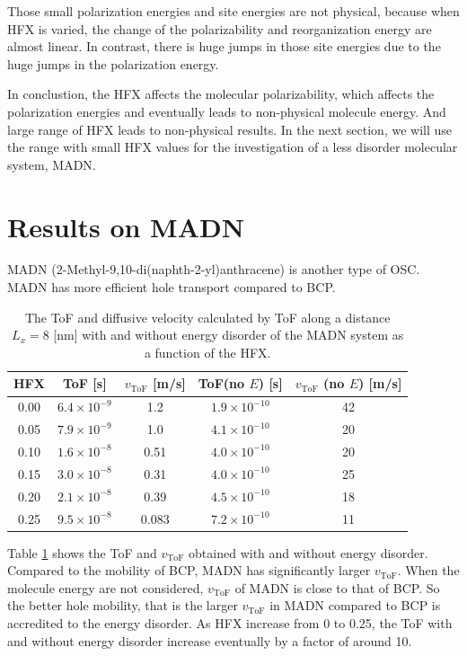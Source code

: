 \documentclass[letterpaper,12pt]{article}
\begin{document}
Those small polarization energies and site energies are not physical, because 
when HFX is varied, the change of the polarizability and reorganization energy are almost linear.
In contrast, there is huge jumps in those site energies due to the huge jumps in the polarization energy. 

In conclustion, the HFX affects the molecular polarizability, which affects the polarization energies and eventually leads to non-physical molecule energy. 
And large range of HFX leads to non-physical results. 
In the next section, we will use the range with small HFX values for the investigation of a less disorder molecular system, MADN. 

\section{Results on MADN}
MADN (2-Methyl-9,10-di(naphth-2-yl)anthracene) is another type of OSC. MADN has more efficient hole transport compared to BCP. 
\begin{table}[H]
    \centering
    \begin{tabular}{c c c c c}
    \hline
        HFX & ToF [s] & $v_\text{ToF}$ [m/s] & ToF(no $E$) [s] & $v_\text{ToF}$ (no $E$) [m/s] \\
    \hline
        0.00 &  $6.4 \times 10^{-9}$ & 1.2 & $1.9 \times 10^{-10}$ & 42 \\
        0.05 & $ 7.9 \times 10^{-9}$ & 1.0 & $4.1 \times 10^{-10}$ & 20 \\
        0.10 & $ 1.6 \times 10^{-8}$ & 0.51 & $4.0 \times 10^{-10} $ & 20 \\
        0.15 & $ 3.0 \times 10^{-8}$ & 0.31 & $4.0 \times 10^{-10} $ & 25 \\
        0.20 & $ 2.1 \times 10^{-8}$ & 0.39 & $4.5 \times 10^{-10}$ & 18 \\
        0.25 & $ 9.5 \times 10^{-8}$ & 0.083 & $7.2 \times 10^{-10}$ & 11 \\
    \hline
    \end{tabular}
    \caption{The ToF and diffusive velocity calculated by ToF along a distance $L_x = 8$ [nm] with and without energy disorder of the MADN system as a function of the HFX. }
    \label{tab:ToF_MADN_HFX}
\end{table}
Table \ref{tab:ToF_MADN_HFX} shows the ToF and $v_\text{ToF}$ obtained with and without energy disorder. 
Compared to the mobility of BCP, MADN has significantly larger $v_\text{ToF}$. When the molecule energy are not considered, $v_\text{ToF}$ of MADN is close to that of BCP. 
So the better hole mobility, that is the larger $v_\text{ToF}$ in MADN compared to BCP is accredited to the energy disorder. 
As HFX increase from 0 to 0.25, the ToF with and without energy disorder increase eventually by a factor of around 10. 
\end{document}
